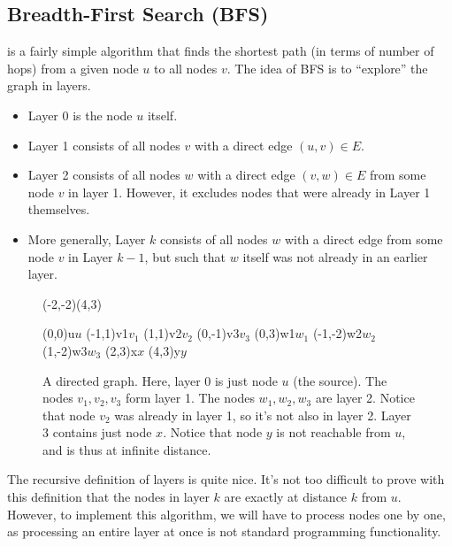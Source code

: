 \subsection{Breadth-First Search (BFS)}
 is a fairly simple algorithm that
finds the shortest path (in terms of number of hops) from a given node
$u$ to all nodes $v$. 
The idea of BFS is to ``explore'' the graph in layers. 
\begin{itemize}
\item Layer 0 is the node $u$ itself.
\item Layer 1 consists of all nodes $v$ with a direct edge $(u,v) \in
  E$.
\item Layer 2 consists of all nodes $w$ with a direct edge $(v,w) \in
  E$ from some node $v$ in layer 1. However, it excludes nodes that
  were already in Layer 1 themselves.
\item More generally, Layer $k$ consists of all nodes $w$ with a
  direct edge from some node $v$ in Layer $k-1$, but such that $w$
  itself was not already in an earlier layer.
\end{itemize}

\begin{figure}[htb]
\begin{center}
\pspicture(-2,-2)(4,3)

\cnodeput[fillstyle=solid,fillcolor=lightgray](0,0){u}{$u$}
\cnodeput(-1,1){v1}{$v_1$}
\cnodeput(1,1){v2}{$v_2$}
\cnodeput(0,-1){v3}{$v_3$}
\cnodeput(0,3){w1}{$w_1$}
\cnodeput(-1,-2){w2}{$w_2$}
\cnodeput(1,-2){w3}{$w_3$}
\cnodeput(2,3){x}{$x$}
\cnodeput(4,3){y}{$y$}


\endpspicture
\end{center}
\caption{A directed graph. Here, layer 0 is just node $u$ (the source).
The nodes $v_1, v_2, v_3$ form layer 1. 
The nodes $w_1, w_2, w_3$ are layer 2.
Notice that node $v_2$ was already in layer 1, so it's not also in
layer 2.
Layer 3 contains just node $x$. Notice that node $y$ is not reachable
from $u$, and is thus at infinite distance. \label{fig:BFS}}
\end{figure}

The recursive definition of layers is quite nice. 
It's not too difficult to prove with this definition that the nodes in
layer $k$ are exactly at distance $k$ from $u$.
However, to implement this algorithm, we will have to process nodes
one by one, as processing an entire layer at once is not standard
programming functionality.


